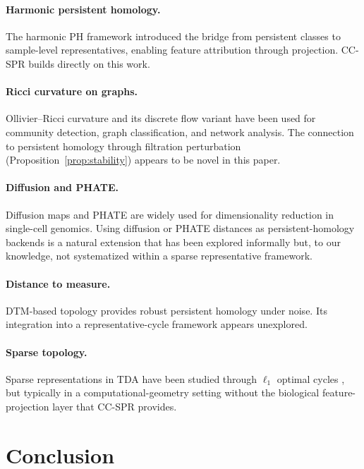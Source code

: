 \documentclass[11pt]{article}
\begin{document}
\paragraph{Harmonic persistent homology.}
The harmonic PH framework \cite{harmonicPH} introduced the bridge from persistent classes to sample-level representatives, enabling feature attribution through projection.
CC-SPR builds directly on this work.

\paragraph{Ricci curvature on graphs.}
Ollivier--Ricci curvature \cite{ollivier2007, ollivier2009} and its discrete flow variant \cite{ni2019community} have been used for community detection, graph classification, and network analysis.
The connection to persistent homology through filtration perturbation (Proposition~\ref{prop:stability}) appears to be novel in this paper.

\paragraph{Diffusion and PHATE.}
Diffusion maps \cite{coifman2006diffusion} and PHATE \cite{moon2019phate} are widely used for dimensionality reduction in single-cell genomics.
Using diffusion or PHATE distances as persistent-homology backends is a natural extension that has been explored informally but, to our knowledge, not systematized within a sparse representative framework.

\paragraph{Distance to measure.}
DTM-based topology \cite{chazal2011dtm, chazal2017robust} provides robust persistent homology under noise.
Its integration into a representative-cycle framework appears unexplored.

\paragraph{Sparse topology.}
Sparse representations in TDA have been studied through $\ell_1$ optimal cycles \cite{chen2011hardness, dey2011optimal}, but typically in a computational-geometry setting without the biological feature-projection layer that CC-SPR provides.

\section{Conclusion}
\end{document}
